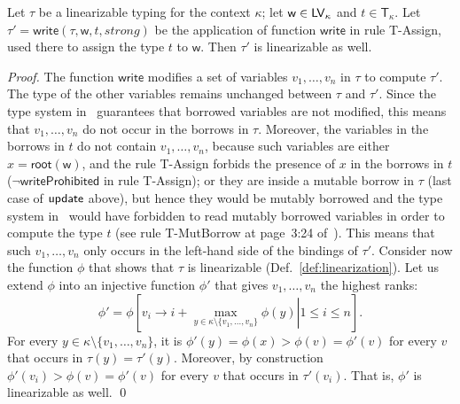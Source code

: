 \begin{lemma}\label{lem:write_invariant}
  Let $\tau$ be a linearizable typing for the context $\kappa$;
  let $\mathsf{w}\in\mathsf{LV}_\kappa$ and $t\in\mathsf{T}_\kappa$.
  Let $\tau'=\mathsf{write}(\tau,\mathsf{w},t,\mathit{strong})$ be
  the application of function $\mathsf{write}$ in rule \textsf{T-Assign},
  used there to assign the type $t$ to $\mathsf{w}$.
  Then $\tau'$ is linearizable as well.
\end{lemma}
\begin{proof}
  The function $\mathsf{write}$ modifies a set of variables $v_1,\ldots,v_n$ in $\tau$ to compute $\tau'$.
  The type of the other variables remains unchanged between $\tau$ and $\tau'$. Since the
  type system in~\cite{Pearce21} guarantees that borrowed variables are not modified,
  this means that $v_1,\ldots,v_n$ do not occur in the borrows in $\tau$. Moreover,
  the variables in the borrows in $t$ do not contain $v_1,\ldots,v_n$, because
  such variables are either $x=\mathsf{root}(\mathsf{w})$, and the rule \textsf{T-Assign}
  forbids the presence of $x$ in the borrows in $t$ ($\neg\mathsf{writeProhibited}$ in rule
  \textsf{T-Assign}); or they are inside a mutable borrow in $\tau$ (last case of
  $\mathsf{update}$ above), but hence they would be mutably borrowed and the type system
  in~\cite{Pearce21} would have forbidden to read mutably borrowed variables in order to compute
  the type $t$ (see rule \textsf{T-MutBorrow} at page~3:24 of~\cite{Pearce21}).
  This means that such $v_1,\ldots,v_n$ only occurs in the left-hand side of the bindings of $\tau'$.
  Consider now the function $\phi$ that shows that $\tau$ is linearizable (Def.~\ref{def:linearization}).
  Let us extend $\phi$ into an injective function $\phi'$ that gives $v_1,\ldots,v_n$ the highest ranks:
  \[
  \phi'=\phi\left[\left.v_i\to i+\max\limits_{y\in\kappa\setminus\{v_1,\ldots,v_n\}}\phi(y)\right|1\le i\le n\right].
  \]
  For every $y\in\kappa\setminus\{v_1,\ldots,v_n\}$, it is
  $\phi'(y)=\phi(x)>\phi(v)=\phi'(v)$ for every $v$ that occurs in $\tau(y)=\tau'(y)$.
  Moreover, by construction $\phi'(v_i)>\phi(v)=\phi'(v)$ for every $v$ that occurs in $\tau'(v_i)$.
  That is, $\phi'$ is linearizable as well.
  \qed
\end{proof}
